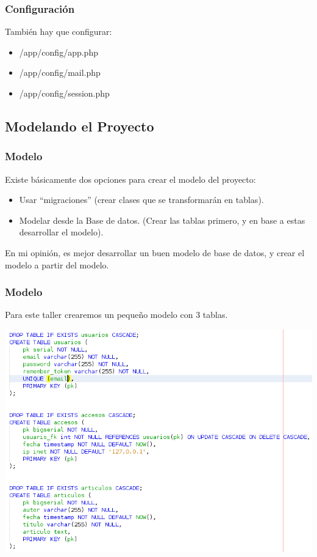 \documentclass[12pt]{beamer}
\begin{document}
\begin{frame}
 \frametitle{Configuración}
 También hay que configurar:
 \begin{itemize}
  \item /app/config/app.php
  \item /app/config/mail.php
  \item /app/config/session.php
 \end{itemize}
\end{frame}

\subsection{Modelando el Proyecto}

\begin{frame}
 \frametitle{Modelo}
 Existe básicamente dos opciones para crear el modelo del proyecto:
 \begin{itemize}
  \item Usar ``migraciones'' (crear clases que se transformarán en tablas).
  \item Modelar desde la Base de datos. (Crear las tablas primero, y en base a estas desarrollar el modelo).
 \end{itemize}
 En mi opinión, es mejor desarrollar un buen modelo de base de datos, y crear el modelo a partir del modelo.
\end{frame}


\begin{frame}
 \frametitle{Modelo}
 Para este taller crearemos un pequeño modelo con 3 tablas.
 \begin{center}
    \includegraphics[scale=0.45]{img/modelo.png}
 \end{center}
\end{frame}
\end{document}
